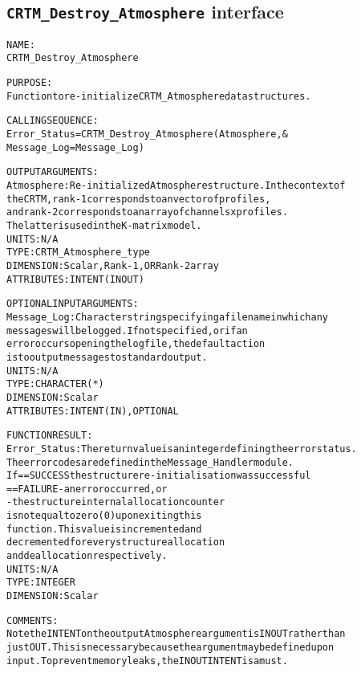 \subsection{\texttt{CRTM\_Destroy\_Atmosphere} interface}
  \label{sec:CRTM_Destroy_Atmosphere_interface}
  \begin{alltt}
 
  NAME:
        CRTM_Destroy_Atmosphere
  
  PURPOSE:
        Function to re-initialize CRTM_Atmosphere data structures.
 
  CALLING SEQUENCE:
        Error_Status = CRTM_Destroy_Atmosphere( Atmosphere             , &
                                                Message_Log=Message_Log  )
 
  OUTPUT ARGUMENTS:
        Atmosphere:   Re-initialized Atmosphere structure. In the context of
                      the CRTM, rank-1 corresponds to an vector of profiles,
                      and rank-2 corresponds to an array of channels x profiles.
                      The latter is used in the K-matrix model.
                      UNITS:      N/A
                      TYPE:       CRTM_Atmosphere_type
                      DIMENSION:  Scalar, Rank-1, OR Rank-2 array
                      ATTRIBUTES: INTENT(IN OUT)
 
  OPTIONAL INPUT ARGUMENTS:
        Message_Log:  Character string specifying a filename in which any
                      messages will be logged. If not specified, or if an
                      error occurs opening the log file, the default action
                      is to output messages to standard output.
                      UNITS:      N/A
                      TYPE:       CHARACTER(*)
                      DIMENSION:  Scalar
                      ATTRIBUTES: INTENT(IN), OPTIONAL
 
  FUNCTION RESULT:
        Error_Status: The return value is an integer defining the error status.
                      The error codes are defined in the Message_Handler module.
                      If == SUCCESS the structure re-initialisation was successful
                         == FAILURE - an error occurred, or
                                    - the structure internal allocation counter
                                      is not equal to zero (0) upon exiting this
                                      function. This value is incremented and
                                      decremented for every structure allocation
                                      and deallocation respectively.
                      UNITS:      N/A
                      TYPE:       INTEGER
                      DIMENSION:  Scalar
 
  COMMENTS:
        Note the INTENT on the output Atmosphere argument is IN OUT rather than
        just OUT. This is necessary because the argument may be defined upon
        input. To prevent memory leaks, the IN OUT INTENT is a must.
 
  \end{alltt}
